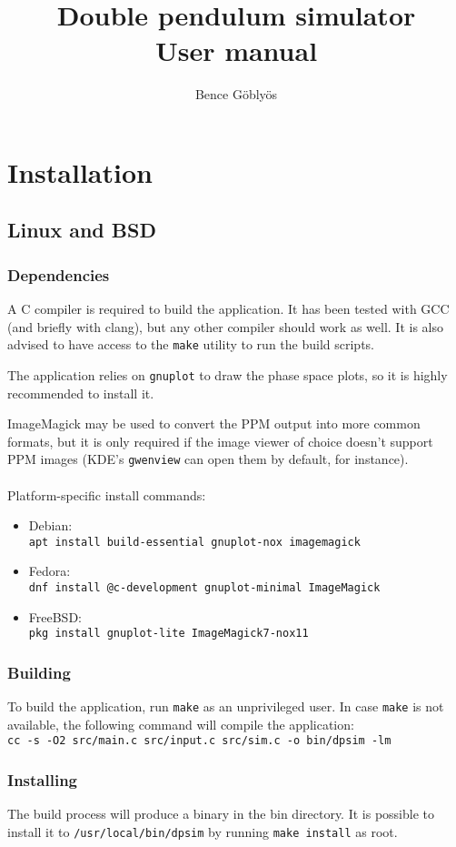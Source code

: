 \documentclass[a4paper,12pt]{article}
\title{Double pendulum simulator\\User manual}
\author{Bence Göblyös}
\begin{document}
\maketitle
\newpage
{}

\section{Installation}

\subsection{Linux and BSD}

\subsubsection{Dependencies}
A C compiler is required to build the application.
It has been tested with GCC (and briefly with clang),
but any other compiler should work as well.
It is also advised to have access to the \texttt{make} utility to run the build scripts.

The application relies on \texttt{gnuplot} to draw the phase space plots,
so it is highly recommended to install it.

ImageMagick may be used to convert the PPM output into more common formats,
but it is only required if the image viewer of choice doesn't support PPM images
(KDE's \texttt{gwenview} can open them by default, for instance).\\\\
Platform-specific install commands:
\begin{itemize}
 \item Debian:\\ \texttt{apt install build-essential gnuplot-nox imagemagick}
 \item Fedora:\\ \texttt{dnf install @c-development gnuplot-minimal ImageMagick}
 \item FreeBSD:\\ \texttt{pkg install gnuplot-lite ImageMagick7-nox11}
\end{itemize}

\subsubsection{Building}

To build the application, run \texttt{make} as an unprivileged user.
In case \texttt{make} is not available,
the following command will compile the application:\\
\texttt{cc -s -O2 src/main.c src/input.c src/sim.c -o bin/dpsim -lm}

\subsubsection{Installing}

The build process will produce a binary in the bin directory.
It is possible to install it to \texttt{/usr/local/bin/dpsim}
by running \texttt{make install} as root.
\end{document}
